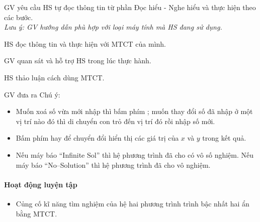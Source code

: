 \begin{tcth}
    \buocmot
    \item GV yêu cầu HS tự đọc thông tin từ phần Đọc hiểu - Nghe hiểu và thực hiện theo các bước.\\
    \textit{Lưu ý: GV hướng dẫn phù hợp với loại máy tính mà HS đang sử dụng. }
    \buochai
    \item HS đọc thông tin và thực hiện với MTCT của mình. 
    \item GV quan sát và hỗ trợ HS trong lúc thực hành. 
    \buocba
    \item HS thảo luận cách dùng MTCT.
    \buocbon
    \item GV đưa ra Chú ý:
    \begin{chuy}
        \begin{itemize}
            \item Muốn xoá số vừa mới nhập thì bấm phím ; muốn thay đổi số đã nhập ở một vị trí nào đó thì di chuyển con trỏ đến vị trí đó rồi nhập số mới.
            \item Bấm phím \fbox{$\blacktriangle$} hay \fbox{$\blacktriangledown$} để chuyển đổi hiển thị các giá trị của $x$ và $y$ trong kết quả.
            \item Nếu máy báo ``Infinite Sol'' thì hệ phương trình đã cho có vô số nghiệm. Nếu máy báo ``No--Solution'' thì hệ phương trình đã cho vô nghiệm.
        \end{itemize}
    \end{chuy}
\end{tcth}

\paragraph{Hoạt động luyện tập}

\muctieu

\begin{itemize}
    \item Củng cố kĩ năng tìm nghiệm của hệ hai phương trình trình bậc nhất hai ẩn bằng MTCT.
\end{itemize}

\noidungsanpham


